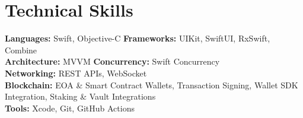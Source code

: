 \section{Technical Skills}
\textbf{Languages:} Swift, Objective-C \quad
\textbf{Frameworks:} UIKit, SwiftUI, RxSwift, Combine\\
\textbf{Architecture:} MVVM \quad
\textbf{Concurrency:} Swift Concurrency\\
\textbf{Networking:} REST APIs, WebSocket\\
\textbf{Blockchain:} EOA \& Smart Contract Wallets, Transaction Signing, Wallet SDK Integration, Staking \& Vault Integrations\\
\textbf{Tools:} Xcode, Git, GitHub Actions
